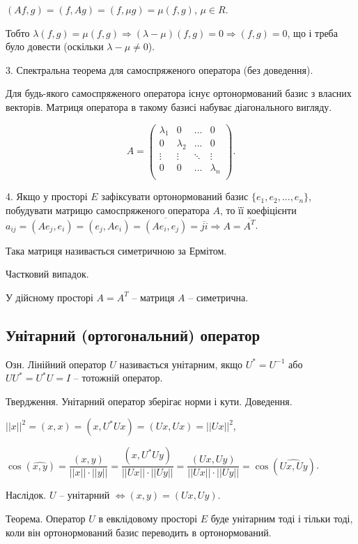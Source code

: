 $(A f, g) = (f, A g) = (f, \mu g) = \mu (f,g)$, $\mu \in R$.

Тобто $\lambda(f, g) = \mu(f,g) \Rightarrow (\lambda - \mu)(f, g) = 0 \Rightarrow (f,g) = 0$,
що і треба було довести (оскільки $\lambda - \mu \neq 0$).

3. Спектральна теорема для самоспряженого оператора (без доведення).

Для будь-якого самоспряженого оператора існує ортонормований базис з
власних векторів. Матриця оператора в такому базисі набуває діагонального
вигляду.

$$A = \begin{pmatrix}
    \lambda_1 & 0         & ...    & 0 \\	
    0         & \lambda_2 & ...    & 0 \\
    \vdots    & \vdots    & \ddots & \vdots \\
    0         & 0         & ...    & \lambda_n \\
\end{pmatrix}.$$

4. Якщо у просторі $E$ зафіксувати ортонормований базис $\{e_1, e_2, ..., e_n\}$,
побудувати матрицю самоспряженого оператора $A$, то її коефіцієнти
$a_{ij} = (A e_j, e_i) = (e_j, A e_i) = \overline{(A e_i, e_j)} = \overline{ji} \Rightarrow A = \overline{A^T}$.

Така матриця називається симетричною за Ермітом.

Частковий випадок.

У дійсному просторі $A = A^T$ -- матриця $A$ -- симетрична.

\subsection*{Унітарний (ортогональний) оператор}

Озн. Лінійний оператор $U$ називається унітарним, якщо $U^* = U^{-1}$ або
$U U^* = U^* U = I$ -- тотожній оператор.

Твердження. Унітарний оператор зберігає норми і кути.
Доведення.

$||x||^2 = (x,x) = (x,U^* U x) = (U x, U x) = ||Ux||^2$,

$\cos(\widehat{x,y})
= \dfrac{(x,y)}{||x|| \cdot ||y||}
= \dfrac{(x,U^* U y)}{||U x|| \cdot ||U y||}
= \dfrac{(U x, U y)}{||U x|| \cdot ||U y||}
= \cos(\widehat{Ux, Uy})$.

Наслідок. $U$ -- унітарний $\Leftrightarrow (x,y) = (U x, U y)$.

Теорема. Оператор $U$ в евклідовому просторі $E$ буде унітарним тоді і
тільки тоді, коли він ортонормований базис переводить в ортонормований.

